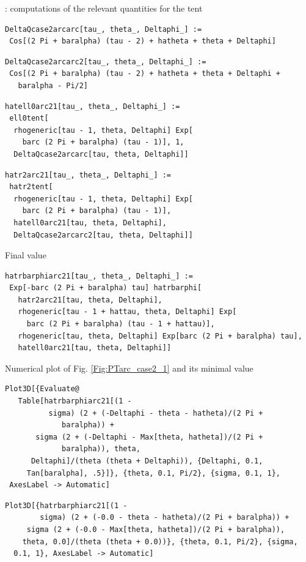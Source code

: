 \documentclass[reqno]{amsart}
\theoremstyle{definition} \newtheorem{definition}{Definition}[section]
\theoremstyle{definition} \newtheorem{remark}[definition]{Remark}
\theoremstyle{plain} \newtheorem{lemma}[definition]{Lemma}
\theoremstyle{plain} \newtheorem{proposition}[definition]{Proposition}
\theoremstyle{plain} \newtheorem{theorem}[definition]{Theorem}
\theoremstyle{plain} \newtheorem{corollary}[definition]{Corollary}
\theoremstyle{definition} \newtheorem{example}[definition]{Example}
\theoremstyle{plain} \newtheorem{claim}[clai]{Claim}
\theoremstyle{definition} \newtheorem{assumption}[definition]{Assumption}
\theoremstyle{definition} \newtheorem{observation}[definition]{Observation}
\newcommand{\1}{\mathbbm 1}
\newcommand{\smed}{\medskip}
\newcommand{\sbig}{\bigskip}
\numberwithin{equation}{section} %
\theoremstyle{plain} \newtheorem*{theorem*}{Theorem}
\theoremstyle{plain} \newtheorem{mthm}[maintheorem]{Main Theorem}
\theoremstyle{plain} \newtheorem*{mthm*}{Main Theorem}
\theoremstyle{plain} \newtheorem*{conjecture*}{Conjecture}
\theoremstyle{plain} \newtheorem{conjecture}[definition]{Conjecture}
\theoremstyle{plain} \newtheorem*{problem*}{Problem}
\begin{document}
\sbig

: computations of the relevant quantities for the tent
\smed
\begin{verbatim}
DeltaQcase2arcarc[tau_, theta_, Deltaphi_] := 
 Cos[(2 Pi + baralpha) (tau - 2) + hatheta + theta + Deltaphi]
\end{verbatim}
\begin{verbatim}
DeltaQcase2arcarc2[tau_, theta_, Deltaphi_] := 
 Cos[(2 Pi + baralpha) (tau - 2) + hatheta + theta + Deltaphi + 
   baralpha - Pi/2]
\end{verbatim}
\begin{verbatim}
hatell0arc21[tau_, theta_, Deltaphi_] := 
 ell0tent[
  rhogeneric[tau - 1, theta, Deltaphi] Exp[
    barc (2 Pi + baralpha) (tau - 1)], 1, 
  DeltaQcase2arcarc[tau, theta, Deltaphi]]
\end{verbatim}
\begin{verbatim}
hatr2arc21[tau_, theta_, Deltaphi_] := 
 hatr2tent[
  rhogeneric[tau - 1, theta, Deltaphi] Exp[
    barc (2 Pi + baralpha) (tau - 1)], 
  hatell0arc21[tau, theta, Deltaphi], 
  DeltaQcase2arcarc2[tau, theta, Deltaphi]]
\end{verbatim}
\smed
Final value
\smed
\begin{verbatim}
hatrbarphiarc21[tau_, theta_, Deltaphi_] := 
 Exp[-barc (2 Pi + baralpha) tau] hatrbarphi[
   hatr2arc21[tau, theta, Deltaphi], 
   rhogeneric[tau - 1 + hattau, theta, Deltaphi] Exp[
     barc (2 Pi + baralpha) (tau - 1 + hattau)], 
   rhogeneric[tau, theta, Deltaphi] Exp[barc (2 Pi + baralpha) tau], 
   hatell0arc21[tau, theta, Deltaphi]]
\end{verbatim}
\smed
Numerical plot of Fig. \ref{Fig:PTarc_case2_1} and its minimal value
\smed
\begin{verbatim}
Plot3D[{Evaluate@
   Table[hatrbarphiarc21[(1 - 
          sigma) (2 + (-Deltaphi - theta - hatheta)/(2 Pi + 
             baralpha)) + 
       sigma (2 + (-Deltaphi - Max[theta, hatheta])/(2 Pi + 
             baralpha)), theta, 
      Deltaphi]/(theta (theta + Deltaphi)), {Deltaphi, 0.1, 
     Tan[baralpha], .5}]}, {theta, 0.1, Pi/2}, {sigma, 0.1, 1}, 
 AxesLabel -> Automatic]
\end{verbatim}
\begin{verbatim}
Plot3D[{hatrbarphiarc21[(1 - 
        sigma) (2 + (-0.0 - theta - hatheta)/(2 Pi + baralpha)) + 
     sigma (2 + (-0.0 - Max[theta, hatheta])/(2 Pi + baralpha)), 
    theta, 0.0]/(theta (theta + 0.0))}, {theta, 0.1, Pi/2}, {sigma, 
  0.1, 1}, AxesLabel -> Automatic]
\end{verbatim}
\end{document}
